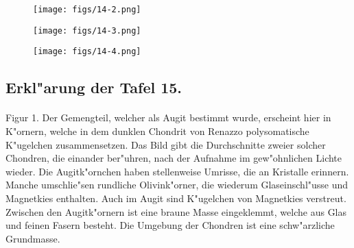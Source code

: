 \documentclass[a4paper, 11pt, oneside, polutonikogreek, german]{article}
\begin{document}
\vspace*{\fill}
\begin{figure}[H]
\centering
\texttt{[image: figs/14-2.png]}
\caption{}
\end{figure}
\vspace*{\fill}
\clearpage

\vspace*{\fill}
\begin{figure}[H]
\centering
\texttt{[image: figs/14-3.png]}
\caption{}
\end{figure}
\vspace*{\fill}
\clearpage

\vspace*{\fill}
\begin{figure}[H]
\centering
\texttt{[image: figs/14-4.png]}
\caption{}
\end{figure}
\vspace*{\fill}
\clearpage

\subsection{Erkl"arung der Tafel 15.}
\paragraph{}
Figur 1. Der Gemengteil, welcher als Augit bestimmt wurde, erscheint hier in K"ornern, welche in dem dunklen Chondrit von Renazzo polysomatische K"ugelchen zusammensetzen. Das Bild gibt die Durchschnitte zweier solcher Chondren, die einander ber"uhren, nach der Aufnahme im gew"ohnlichen Lichte wieder. Die Augitk"ornchen haben stellenweise Umrisse, die an Kristalle erinnern. Manche umschlie"sen rundliche Olivink"orner, die wiederum Glaseinschl"usse und Magnetkies enthalten. Auch im Augit sind K"ugelchen von Magnetkies verstreut. Zwischen den Augitk"ornern ist eine braune Masse eingeklemmt, welche aus Glas und feinen Fasern besteht. Die Umgebung der Chondren ist eine schw"arzliche Grundmasse.
\end{document}
